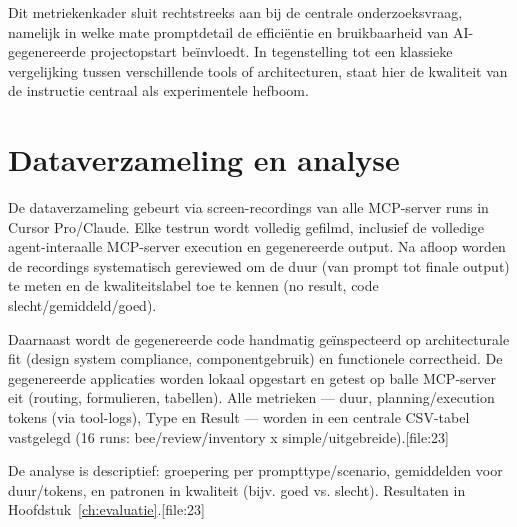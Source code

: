 Dit metriekenkader sluit rechtstreeks aan bij de centrale onderzoeksvraag, namelijk in welke mate promptdetail de efficiëntie en bruikbaarheid van AI-gegenereerde projectopstart beïnvloedt. In tegenstelling tot een klassieke vergelijking tussen verschillende tools of architecturen, staat hier de kwaliteit van de instructie centraal als experimentele hefboom.


\section{Dataverzameling en analyse}
\label{sec:data-analyse}

De dataverzameling gebeurt via screen-recordings van alle MCP-server runs in Cursor Pro/Claude. Elke testrun wordt volledig gefilmd, inclusief de volledige agent-interaalle MCP-server execution en gegenereerde output. Na afloop worden de recordings systematisch gereviewed om de duur (van prompt tot finale output) te meten en de kwaliteitslabel toe te kennen (no result, code slecht/gemiddeld/goed).

Daarnaast wordt de gegenereerde code handmatig geïnspecteerd op architecturale fit (design system compliance, componentgebruik) en functionele correctheid. De gegenereerde applicaties worden lokaal opgestart en getest op balle MCP-server eit (routing, formulieren, tabellen). Alle metrieken --- duur, planning/execution tokens (via tool-logs), Type en Result --- worden in een centrale CSV-tabel vastgelegd (16 runs: bee/review/inventory x simple/uitgebreide).[file:23]

De analyse is descriptief: groepering per prompttype/scenario, gemiddelden voor duur/tokens, en patronen in kwaliteit (bijv. goed vs. slecht). Resultaten in Hoofdstuk~\ref{ch:evaluatie}.[file:23]